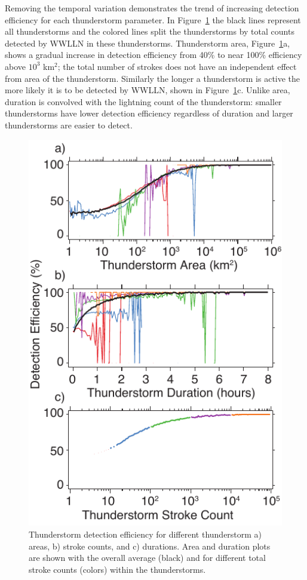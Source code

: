 Removing the temporal variation demonstrates the trend of increasing detection efficiency for each thunderstorm parameter.
In Figure~\ref{thunderstorm:fig:deParameter} the black lines represent all thunderstorms and the colored lines split the thunderstorms by total counts detected by WWLLN in these thunderstorms.
Thunderstorm area, Figure~\ref{thunderstorm:fig:deParameter}a, shows a gradual increase in detection efficiency from 40\% to near 100\% efficiency above $10^3$ km$^2$; the total number of strokes does not have an independent effect from area of the thunderstorm.
Similarly the longer a thunderstorm is active the more likely it is to be detected by WWLLN, shown in Figure~\ref{thunderstorm:fig:deParameter}c.
Unlike area, duration is convolved with the lightning count of the thunderstorm: smaller thunderstorms have lower detection efficiency regardless of duration and larger thunderstorms are easier to detect.

\begin{figure}[ht!]
   \centering
   \includegraphics[scale=1]{thunderstorm/Figures/deParameter.pdf}
   \caption{Thunderstorm detection efficiency for different thunderstorm a) areas, b) stroke counts, and c) durations.
           Area and duration plots are shown with the overall average (black) and for different total stroke counts (colors) within the thunderstorms.}
   \label{thunderstorm:fig:deParameter}
\end{figure}

